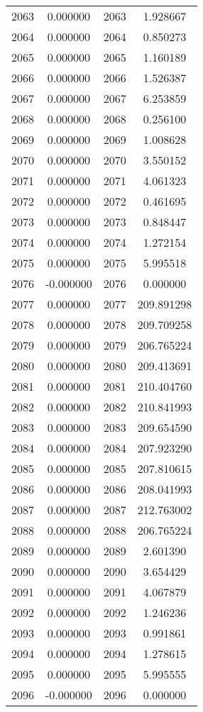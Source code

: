 \documentclass[12pt]{article}
\begin{document}
\begin{longtable}{@{}cccc@{}}
2063 & 0.000000 & 2063 & 1.928667 \\
2064 & 0.000000 & 2064 & 0.850273 \\
2065 & 0.000000 & 2065 & 1.160189 \\
2066 & 0.000000 & 2066 & 1.526387 \\
2067 & 0.000000 & 2067 & 6.253859 \\
2068 & 0.000000 & 2068 & 0.256100 \\
2069 & 0.000000 & 2069 & 1.008628 \\
2070 & 0.000000 & 2070 & 3.550152 \\
2071 & 0.000000 & 2071 & 4.061323 \\
2072 & 0.000000 & 2072 & 0.461695 \\
2073 & 0.000000 & 2073 & 0.848447 \\
2074 & 0.000000 & 2074 & 1.272154 \\
2075 & 0.000000 & 2075 & 5.995518 \\
2076 & -0.000000 & 2076 & 0.000000 \\
2077 & 0.000000 & 2077 & 209.891298 \\
2078 & 0.000000 & 2078 & 209.709258 \\
2079 & 0.000000 & 2079 & 206.765224 \\
2080 & 0.000000 & 2080 & 209.413691 \\
2081 & 0.000000 & 2081 & 210.404760 \\
2082 & 0.000000 & 2082 & 210.841993 \\
2083 & 0.000000 & 2083 & 209.654590 \\
2084 & 0.000000 & 2084 & 207.923290 \\
2085 & 0.000000 & 2085 & 207.810615 \\
2086 & 0.000000 & 2086 & 208.041993 \\
2087 & 0.000000 & 2087 & 212.763002 \\
2088 & 0.000000 & 2088 & 206.765224 \\
2089 & 0.000000 & 2089 & 2.601390 \\
2090 & 0.000000 & 2090 & 3.654429 \\
2091 & 0.000000 & 2091 & 4.067879 \\
2092 & 0.000000 & 2092 & 1.246236 \\
2093 & 0.000000 & 2093 & 0.991861 \\
2094 & 0.000000 & 2094 & 1.278615 \\
2095 & 0.000000 & 2095 & 5.995555 \\
2096 & -0.000000 & 2096 & 0.000000 \\

\end{longtable}
\end{document}
